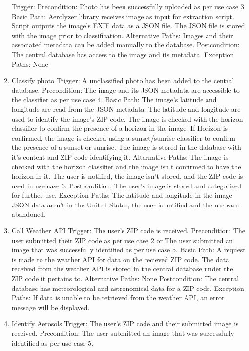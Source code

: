 \documentclass[journal,10pt,draftclsnofoot,onecolumn]{IEEEtran}
\begin{document}
\begin{singlespace}
\begin{enumerate}
Trigger:
Precondition: Photo has been successfully uploaded as per use case 3
Basic Path: 
Aerolyzer library receives image as input for extraction script.
Script outputs the image's EXIF data as a JSON file.
The JSON file is stored with the image prior to classification.
Alternative Paths: Images and their associated metadata can be added manually to the database.
Postcondition: The central database has access to the image and its metadata.
Exception Paths: None
\\
\item Classify photo
Trigger: A unclassified photo has been added to the central database.
Precondition: The image and its JSON metadata are accessible to the classifier as per use case 4.
Basic Path:
	The image's latitude and longitude are read from the JSON metadata.
	The latitude and longitude are used to identify the image's ZIP code.
The image is checked with the horizon classifier to confirm the presence of a horizon in the image.
If Horizon is confirmed, the image is checked using a sunset/sunrise classifier to confirm the presence of a sunset or sunrise.
	The image is stored in the database with it's content and ZIP code identifying it.
Alternative Paths: The image is checked with the horizon classifier and the image isn't confirmed to have the horizon in it. The user is notified, the image isn't stored, and the ZIP code is used in use case 6.
Postcondition: The user's image is stored and categorized for further use.
Exception Paths: The latitude and longitude in the image JSON data aren't in the United States, the user is notified and the use case abandoned.
\\
\item Call Weather API
Trigger: The user's ZIP code is received.
Precondition: The user submitted their ZIP code as per use case 2 or The user submitted an image that was successfully identified as per use case 5.
Basic Path:
A request is made to the weather API for data on the recieved ZIP code.
The data received from the weather API is stored in the central database under the ZIP code it pertains to.
Alternative Paths: None
Postcondition: The central database has meteorological and astronomical data for a ZIP code.
Exception Paths: If data is unable to be retrieved from the weather API, an error message will be displayed.
\\
\item Identify Aerosols
Trigger: The user's ZIP code and their submitted image is received.
Precondition: The user submitted an image that was successfully identified as per use case 5.

\end{enumerate}
\end{singlespace}
\end{document}
